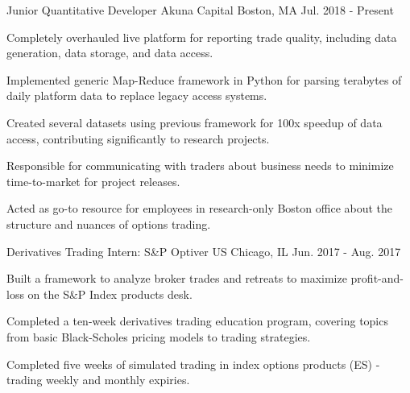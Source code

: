 

\begin{cventries}
    \cventry
      {Junior Quantitative Developer} %
      {Akuna Capital} %
      {Boston, MA} %
      {Jul. 2018 - Present} %
      {
        \begin{cvitems} %
          \item {Completely overhauled live platform for reporting trade quality, including data generation, data storage, and data access.}
          \item {Implemented generic Map-Reduce framework in Python for parsing terabytes of daily platform data to replace legacy access systems.}
          \item {Created several datasets using previous framework for 100x speedup of data access, contributing significantly to research projects.}
          \item {Responsible for communicating with traders about business needs to minimize time-to-market for project releases.}
          \item {Acted as go-to resource for employees in research-only Boston office about the structure and nuances of options trading.}
        \end{cvitems}
      }
    \cventry
      {Derivatives Trading Intern: S\&P} %
      {Optiver US} %
      {Chicago, IL} %
      {Jun. 2017 - Aug. 2017} %
      {
        \begin{cvitems} %
          \item {Built a framework to analyze broker trades and retreats to maximize profit-and-loss on the S\&P Index products desk.}
          \item {Completed a ten-week derivatives trading education program, covering topics from basic Black-Scholes pricing models to trading strategies.}
          \item {Completed five weeks of simulated trading in index options products (ES) - trading weekly and monthly expiries.}

\end{cvitems}}
\end{cventries}
